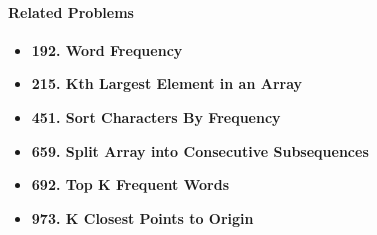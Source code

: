 \paragraph{Related Problems}
\begin{itemize}
\item \textbf{192. Word Frequency}
\item \textbf{215. Kth Largest Element in an Array}
\item \textbf{451. Sort Characters By Frequency}
\item \textbf{659. Split Array into Consecutive Subsequences}
\item \textbf{692. Top K Frequent Words}
\item \textbf{973. K Closest Points to Origin}
\end{itemize}

